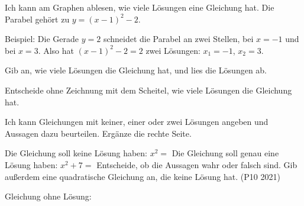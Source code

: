\begin{aufgabe}{Ich kann am Graphen ablesen, wie viele Lösungen eine Gleichung hat. Die Parabel gehört zu $y = (x - 1)^2 - 2$.}

\begin{ksys}[xmin=-2,xmax=6,ymin=-4,ymax=4,ablesen]
\end{ksys}

Beispiel: Die Gerade $y = 2$ schneidet die Parabel an zwei Stellen, bei $x = -1$ und bei $x = 3$. Also hat $(x - 1)^2 - 2 = 2$ zwei Lösungen: $x_1 = -1$, $x_2 = 3$.\par
Gib an, wie viele Lösungen die Gleichung hat, und lies die Lösungen ab.
\begin{geruest}
\end{geruest}
Entscheide ohne Zeichnung mit dem Scheitel, wie viele Lösungen die Gleichung hat.
\begin{geruest}
\end{geruest}
\end{aufgabe}

\begin{aufgabe}{Ich kann Gleichungen mit keiner, einer oder zwei Lösungen angeben und Aussagen dazu beurteilen. Ergänze die rechte Seite.}
\begin{teile}
\teil Die Gleichung soll keine Lösung haben: \quad $x^2 =$ \leerfeld
\teil Die Gleichung soll genau eine Lösung haben: \quad $x^2 + 7 =$ \leerfeld
\teil Entscheide, ob die Aussagen wahr oder falsch sind. Gib außerdem eine quadratische Gleichung an, die keine Lösung hat. (P10 2021)
\end{teile}
\par\medskip Gleichung ohne Lösung: \leerfeld \leerfeld
\end{aufgabe}

